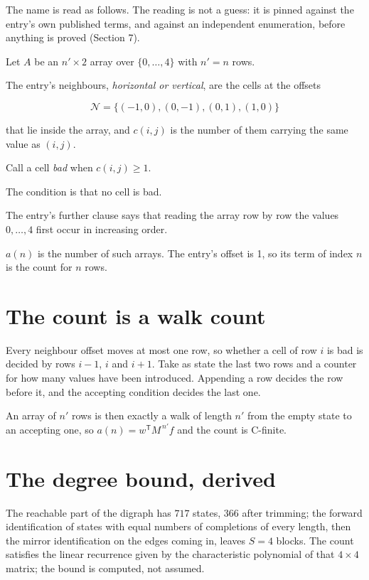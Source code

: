 \documentclass[11pt]{article}
\theoremstyle{definition}
\begin{document}
The name is read as follows. The reading is not a guess: it is pinned against the entry's own published terms, and against an independent enumeration, before anything is proved (Section 7).

Let $A$ be an $n' \times 2$ array over $\{0,\dots,4\}$ with $n' = n$ rows.

The entry's neighbours, {\itshape horizontal or vertical}, are the cells at the offsets

\[\mathcal{N} = \{(-1,0), (0,-1), (0,1), (1,0)\}\]

that lie inside the array, and $c(i,j)$ is the number of them carrying the same value as $(i,j)$.

Call a cell {\itshape bad} when $c(i,j) \ge 1$.

The condition is that no cell is bad.

The entry's further clause says that reading the array row by row the values $0,\dots,4$ first occur in increasing order.

$a(n)$ is the number of such arrays. The entry's offset is 1, so its term of index $n$ is the count for $n$ rows.

\section{The count is a walk count}

Every neighbour offset moves at most one row, so whether a cell of row $i$ is bad is decided by rows $i-1$, $i$ and $i+1$. Take as state the last two rows and a counter for how many values have been introduced. Appending a row decides the row before it, and the accepting condition decides the last one.

An array of $n'$ rows is then exactly a walk of length $n'$ from the empty state to an accepting one, so $a(n) = w^{\mathsf T}M^{\,n'}f$ and the count is C-finite.

\section{The degree bound, derived}

The reachable part of the digraph has $717$ states, $366$ after trimming; the forward identification of states with equal numbers of completions of every length, then the mirror identification on the edges coming in, leaves $S = 4$ blocks. The count satisfies the linear recurrence given by the characteristic polynomial of that $4\times4$ matrix; the bound is computed, not assumed.
\end{document}
